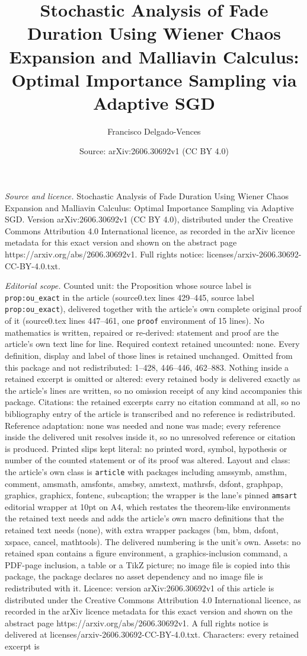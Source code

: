 \documentclass[10pt,a4paper]{amsart}
\title[Stochastic Analysis of Fade Duration Using Wiener Chaos Expa]{Stochastic Analysis of Fade Duration Using Wiener Chaos Expansion and Malliavin Calculus: Optimal Importance Sampling via Adaptive SGD}
\author{Francisco Delgado-Vences}
\date{Source: arXiv:2606.30692v1 (CC BY 4.0)}
\begin{document}
\maketitle

\noindent\emph{Source and licence.} Stochastic Analysis of Fade Duration Using Wiener Chaos Expansion and Malliavin Calculus: Optimal Importance Sampling via Adaptive SGD. Version arXiv:2606.30692v1 (CC BY 4.0), distributed under the Creative Commons Attribution 4.0 International licence, as recorded in the arXiv licence metadata for this exact version and shown on the abstract page https://arxiv.org/abs/2606.30692v1. Full rights notice: licenses/arxiv-2606.30692-CC-BY-4.0.txt.\par\smallskip

\noindent\textit{Editorial scope.} Counted unit: the Proposition whose source label is \texttt{prop:ou\_exact} in the article (source0.tex lines 429--445, source label \texttt{prop:ou\_exact}), delivered together with the article's own complete original proof of it (source0.tex lines 447--461, one \texttt{proof} environment of 15 lines). No mathematics is written, repaired or re-derived: statement and proof are the article's own text line for line. Required context retained uncounted: none. Every definition, display and label of those lines is retained unchanged. Omitted from this package and not redistributed: 1--428, 446--446, 462--883. Nothing inside a retained excerpt is omitted or altered: every retained body is delivered exactly as the article's lines are written, so no omission receipt of any kind accompanies this package. Citations: the retained excerpts carry no citation command at all, so no bibliography entry of the article is transcribed and no reference is redistributed. Reference adaptation: none was needed and none was made; every reference inside the delivered unit resolves inside it, so no unresolved reference or citation is produced. Printed slips kept literal: no printed word, symbol, hypothesis or number of the counted statement or of its proof was altered. Layout and class: the article's own class is \texttt{article} with packages including amssymb, amsthm, comment, amsmath, amsfonts, amsbsy, amstext, mathrsfs, dsfont, graphpap, graphics, graphicx, fontenc, subcaption; the wrapper is the lane's pinned \texttt{amsart} editorial wrapper at 10pt on A4, which restates the theorem-like environments the retained text needs and adds the article's own macro definitions that the retained text needs (none), with extra wrapper packages (bm, bbm, dsfont, xspace, cancel, mathtools). The delivered numbering is the unit's own. Assets: no retained span contains a figure environment, a graphics-inclusion command, a PDF-page inclusion, a table or a TikZ picture; no image file is copied into this package, the package declares no asset dependency and no image file is redistributed with it. Licence: version arXiv:2606.30692v1 of this article is distributed under the Creative Commons Attribution 4.0 International licence, as recorded in the arXiv licence metadata for this exact version and shown on the abstract page https://arxiv.org/abs/2606.30692v1. A full rights notice is delivered at licenses/arxiv-2606.30692-CC-BY-4.0.txt. Characters: every retained excerpt is 
\end{document}

